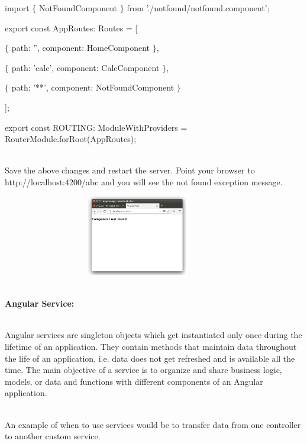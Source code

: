 \documentclass{article}
\begin{document}
\noindent import $\mathrm{\{}$ NotFoundComponent $\mathrm{\}}$ from './notfound/notfound.component';

\noindent 

\noindent export const AppRoutes: Routes = [

\noindent $\mathrm{\{}$ path: '', component: HomeComponent $\mathrm{\}}$,

\noindent $\mathrm{\{}$ path: 'calc', component: CalcComponent $\mathrm{\}}$,

\noindent $\mathrm{\{}$ path: '**', component: NotFoundComponent $\mathrm{\}}$

\noindent ];

\noindent 

\noindent export const ROUTING: ModuleWithProviders = RouterModule.forRoot(AppRoutes);

\noindent \\ Save the above changes and restart the server. Point your browser to http://localhost:4200/abc and you will see the not found exception message.

\begin{center}
	\noindent  \includegraphics*[width=4.66in, height=1.39in, trim=0.00in 1.38in 0.00in 0.00in]{IMG-05-03}
\end{center}

\noindent 
\newpage
{}

\noindent \\ \textbf{Angular Service:}

\noindent 

\noindent \\ Angular services are singleton objects which get instantiated only once during the lifetime of an application. They contain methods that maintain data throughout the life of an application, i.e.  data does not get refreshed and is available all the time. The main objective of a service is to organize and share business logic, models, or data and functions with different components of an Angular application.

\noindent \\ An example of when to use services would be to transfer data from one controller to another custom service.
\end{document}
